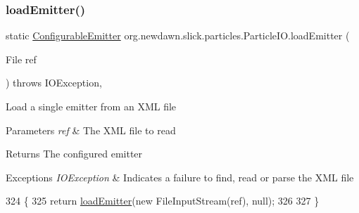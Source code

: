 \subsubsection{\texorpdfstring{load\+Emitter()}{loadEmitter()}\hspace{0.1cm}{\footnotesize\ttfamily [2/6]}}
{\footnotesize\ttfamily static \mbox{\hyperlink{classorg_1_1newdawn_1_1slick_1_1particles_1_1_configurable_emitter}{Configurable\+Emitter}} org.\+newdawn.\+slick.\+particles.\+Particle\+I\+O.\+load\+Emitter (\begin{DoxyParamCaption}\item[{File}]{ref }\end{DoxyParamCaption}) throws I\+O\+Exception\hspace{0.3cm}{\ttfamily [inline]}, {\ttfamily [static]}}

Load a single emitter from an X\+ML file


\begin{DoxyParams}{Parameters}
{\em ref} & The X\+ML file to read \\
\hline
\end{DoxyParams}
\begin{DoxyReturn}{Returns}
The configured emitter 
\end{DoxyReturn}

\begin{DoxyExceptions}{Exceptions}
{\em I\+O\+Exception} & Indicates a failure to find, read or parse the X\+ML file \\
\hline
\end{DoxyExceptions}

\begin{DoxyCode}
324                                                                                \{
325         \textcolor{keywordflow}{return} \mbox{\hyperlink{classorg_1_1newdawn_1_1slick_1_1particles_1_1_particle_i_o_af2afc8b074ac941f5b987b1396747a0f}{loadEmitter}}(\textcolor{keyword}{new} FileInputStream(ref), null);
326 
327     \}
\end{DoxyCode}
\mbox{\label{classorg_1_1newdawn_1_1slick_1_1particles_1_1_particle_i_o_a11b12fb004b65bf944237efd5f3159d4}} 
